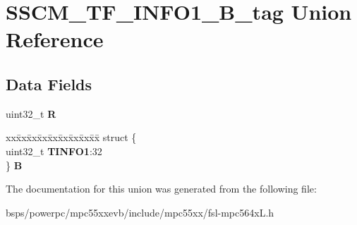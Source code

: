\hypertarget{unionSSCM__TF__INFO1__32B__tag}{}\section{S\+S\+C\+M\+\_\+\+T\+F\+\_\+\+I\+N\+F\+O1\+\_\+B\+\_\+tag Union Reference}
\label{unionSSCM__TF__INFO1__32B__tag}
\subsection*{Data Fields}
\begin{DoxyCompactItemize}
\item 
\mbox{\label{unionSSCM__TF__INFO1__32B__tag_af18315c3e4e5a8a085d5d60dce8f1e2d}} 
uint32\+\_\+t {\bfseries R}
\item 
\mbox{\label{unionSSCM__TF__INFO1__32B__tag_aa5f034e261b2c71ae1cbdee06607006f}} 
\begin{tabbing}
xx\=xx\=xx\=xx\=xx\=xx\=xx\=xx\=xx\=\kill
struct \{\\
\>uint32\_t {\bfseries TINFO1}:32\\
\} {\bfseries B}\\

\end{tabbing}\end{DoxyCompactItemize}


The documentation for this union was generated from the following file\+:\begin{DoxyCompactItemize}
\item 
bsps/powerpc/mpc55xxevb/include/mpc55xx/fsl-\/mpc564x\+L.\+h\end{DoxyCompactItemize}
